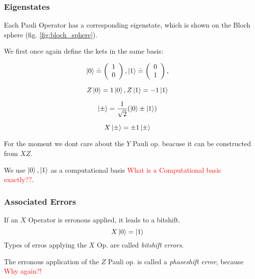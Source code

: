 \subsubsection{Eigenstates}

Each Pauli Operator has a corresponding eigenstate, which is shown on the Bloch sphere (fig. \ref{fig:bloch_sphere}).

We first once again define the kets in the same basis:

\begin{equation}
   \ket{0}  \doteq  \left(\begin{array}{c} 1 \\ 0 \end{array}\right), \ket{1} \doteq \left(\begin{array}{c} 0 \\ 1 \end{array}\right),
\end{equation}

\begin{equation}
    Z \ket{0} = 1 \ket{0}, Z \ket{1} = -1 \ket{1}
\end{equation}

\begin{equation}
    \ket{\pm}  =  \frac{1}{\sqrt{2}}( \ket{0} \pm  \ket{1}) 
\end{equation}

\begin{equation}
   X \ket{\pm} = \pm1 \ket{\pm} 
\end{equation}

For the moment we dont care about the $Y$ Pauli op. beacuse it can be constructed from $XZ$.

We use $\ket{0},\ket{1}$ as a computational basis \textcolor{red}{What is a Computational basis exactly??}. 

\subsubsection{Associated Errors}

If an $X$ Operator is erronous applied, it leads to a bitshift. 
\begin{equation}
    X\ket{0} = \ket{1}
\end{equation}
Types of erros applying the $X$ Op. are called \textit{bitshift errors}.

The erronous application of the $Z$ Pauli op. is called a \textit{phaseshift error}, because 
\textcolor{red}{Why again?!}


